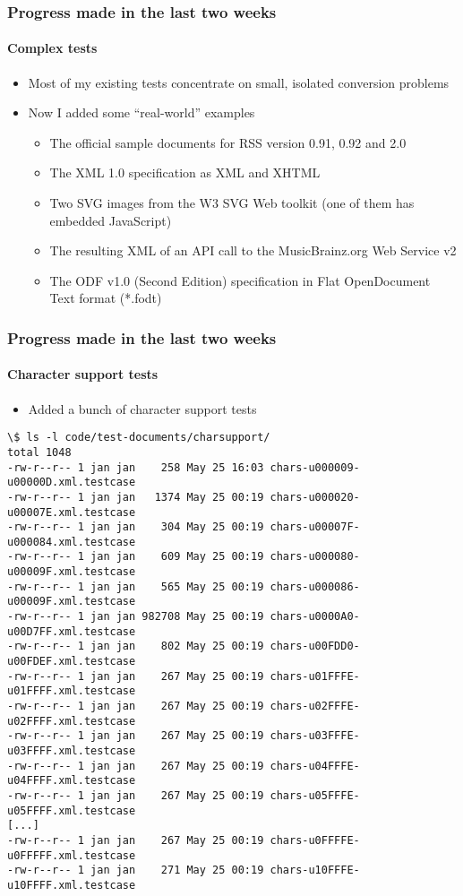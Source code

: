 \documentclass[
    alternativetitlepage=alternativ,
    cornerlogo=hgi_nds_logo2,
    sectionoverview,
]{rubpresentation}
\begin{document}
\begin{frame}[fragile]
    \frametitle{Progress made in the last two weeks}
    \framesubtitle{Complex tests}
    \begin{itemize}
        \item{} Most of my existing tests concentrate on small, isolated conversion problems
        \item{} Now I added some \enquote{real-world} examples
        \begin{itemize}
            \item{} The official sample documents for RSS version 0.91, 0.92 and 2.0
            \item{} The XML 1.0 specification as XML and XHTML
            \item{} Two SVG images from the W3 SVG Web toolkit (one of them has embedded JavaScript)
            \item{} The resulting XML of an API call to the MusicBrainz.org Web Service v2
            \item{} The ODF v1.0 (Second Edition) specification in Flat OpenDocument Text format (*.fodt)
        \end{itemize}
    \end{itemize}
\end{frame}

\begin{frame}[fragile]
    \frametitle{Progress made in the last two weeks}
    \framesubtitle{Character support tests}
    \begin{itemize}
        \item{} Added a bunch of character support tests
    \end{itemize}
    \begin{lstlisting}[basicstyle=\fontsize{7}{11}\ttfamily,numbers=none]
\$ ls -l code/test-documents/charsupport/
total 1048
-rw-r--r-- 1 jan jan    258 May 25 16:03 chars-u000009-u00000D.xml.testcase
-rw-r--r-- 1 jan jan   1374 May 25 00:19 chars-u000020-u00007E.xml.testcase
-rw-r--r-- 1 jan jan    304 May 25 00:19 chars-u00007F-u000084.xml.testcase
-rw-r--r-- 1 jan jan    609 May 25 00:19 chars-u000080-u00009F.xml.testcase
-rw-r--r-- 1 jan jan    565 May 25 00:19 chars-u000086-u00009F.xml.testcase
-rw-r--r-- 1 jan jan 982708 May 25 00:19 chars-u0000A0-u00D7FF.xml.testcase
-rw-r--r-- 1 jan jan    802 May 25 00:19 chars-u00FDD0-u00FDEF.xml.testcase
-rw-r--r-- 1 jan jan    267 May 25 00:19 chars-u01FFFE-u01FFFF.xml.testcase
-rw-r--r-- 1 jan jan    267 May 25 00:19 chars-u02FFFE-u02FFFF.xml.testcase
-rw-r--r-- 1 jan jan    267 May 25 00:19 chars-u03FFFE-u03FFFF.xml.testcase
-rw-r--r-- 1 jan jan    267 May 25 00:19 chars-u04FFFE-u04FFFF.xml.testcase
-rw-r--r-- 1 jan jan    267 May 25 00:19 chars-u05FFFE-u05FFFF.xml.testcase
[...]
-rw-r--r-- 1 jan jan    267 May 25 00:19 chars-u0FFFFE-u0FFFFF.xml.testcase
-rw-r--r-- 1 jan jan    271 May 25 00:19 chars-u10FFFE-u10FFFF.xml.testcase
    \end{lstlisting}
\end{frame}
\end{document}

